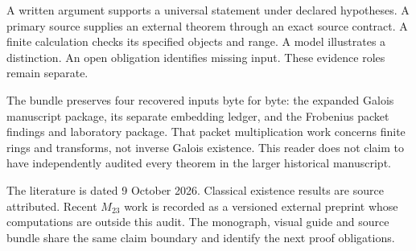 A written argument supports a universal statement under declared hypotheses. A primary source supplies an external theorem through an exact source contract. A finite calculation checks its specified objects and range. A model illustrates a distinction. An open obligation identifies missing input. These evidence roles remain separate.

The bundle preserves four recovered inputs byte for byte: the expanded Galois manuscript package, its separate embedding ledger, and the Frobenius packet findings and laboratory package. That packet multiplication work concerns finite rings and transforms, not inverse Galois existence. This reader does not claim to have independently audited every theorem in the larger historical manuscript.

The literature is dated 9 October 2026. Classical existence results are source attributed. Recent $M_{23}$ work is recorded as a versioned external preprint whose computations are outside this audit. The monograph, visual guide and source bundle share the same claim boundary and identify the next proof obligations.


